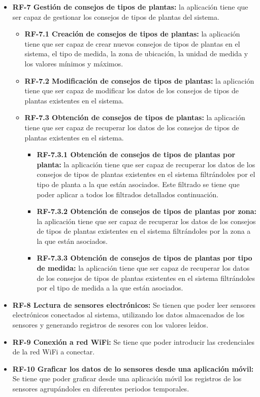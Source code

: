 \begin{itemize}
        \item \textbf{RF-7 Gestión de consejos de tipos de plantas:} la aplicación tiene que ser capaz de gestionar los consejos de tipos de plantas del sistema.
            \begin{itemize}
                \item \textbf{RF-7.1 Creación de consejos de tipos de plantas:} la aplicación tiene que ser capaz de crear nuevos consejos de tipos de plantas en el sistema, el tipo de medida, la zona de ubicación,  la unidad de medida y los valores mínimos y máximos.
                \item \textbf{RF-7.2 Modificación de consejos de tipos de plantas:} la aplicación tiene que ser capaz de modificar los datos de los consejos de tipos de plantas existentes en el sistema.
                \item \textbf{RF-7.3 Obtención de consejos de tipos de plantas:} la aplicación tiene que ser capaz de recuperar los datos de los consejos de tipos de plantas existentes en el sistema.
                \begin{itemize}
                    \item \textbf{RF-7.3.1 Obtención de consejos de tipos de plantas por planta:} la aplicación tiene que ser capaz de recuperar los datos de los consejos de tipos de plantas existentes en el sistema filtrándoles por el tipo de planta a la que están asociados. Este filtrado se tiene que poder aplicar a todos los filtrados detallados continuación. 
    				\item \textbf{RF-7.3.2 Obtención de consejos de tipos de plantas por zona:} la aplicación tiene que ser capaz de recuperar los datos de los consejos de tipos de plantas existentes en el sistema filtrándoles por la zona a la que están asociados.
    				\item \textbf{RF-7.3.3 Obtención de consejos de tipos de plantas por tipo de medida:} la aplicación tiene que ser capaz de recuperar los datos de los consejos de tipos de plantas existentes en el sistema filtrándoles por el tipo de medida a la que están asociados.
                \end{itemize}
            \end{itemize}
        \item \textbf{RF-8 Lectura de sensores electrónicos:} Se tienen que poder leer sensores electrónicos conectados al sistema, utilizando los datos almacenados de los sensores y generando registros de sesores con los valores leidos.
        \item \textbf{RF-9 Conexión a red WiFi:} Se tiene que poder introducir las credenciales de la red WiFi a conectar.
        \item \textbf{RF-10 Graficar los datos de lo sensores desde una aplicación móvil:} Se tiene que poder graficar desde una aplicación móvil los registros de los sensores agrupándoles en diferentes periodos temporales.
    \end{itemize}

